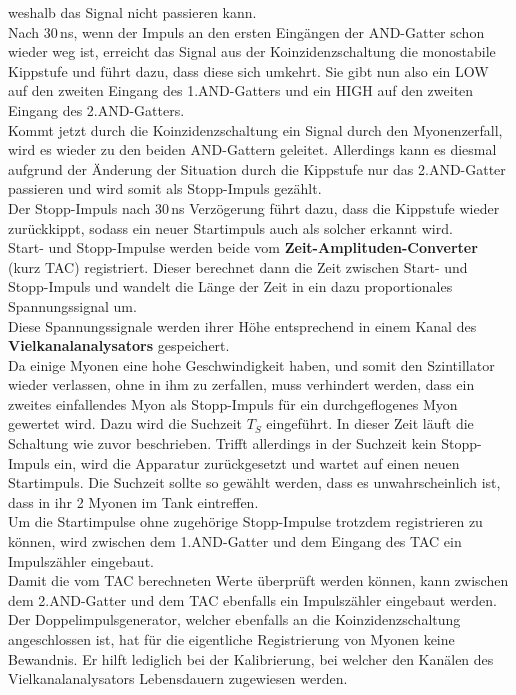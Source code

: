     weshalb das Signal nicht passieren kann.\\
    Nach 30\,ns, wenn der Impuls an den ersten Eingängen der AND-Gatter
    schon wieder weg ist, erreicht das Signal aus der Koinzidenzschaltung
    die monostabile Kippstufe und führt dazu, dass diese sich umkehrt.
    Sie gibt nun also ein LOW auf den zweiten Eingang des 1.AND-Gatters und ein
    HIGH auf den zweiten Eingang des 2.AND-Gatters. \\
    Kommt jetzt durch die Koinzidenzschaltung ein Signal durch den Myonenzerfall,
    wird es wieder zu den beiden AND-Gattern geleitet. Allerdings kann es
    diesmal aufgrund der Änderung der Situation durch die Kippstufe
    nur das 2.AND-Gatter passieren und wird somit als Stopp-Impuls gezählt.\\
    Der Stopp-Impuls nach 30\,ns Verzögerung führt dazu, dass
    die Kippstufe wieder zurückkippt, sodass ein neuer Startimpuls auch
    als solcher erkannt wird.\\
    Start- und Stopp-Impulse werden beide vom \textbf{Zeit-Amplituden-Converter}
    (kurz TAC) registriert. Dieser berechnet dann die Zeit zwischen Start-
    und Stopp-Impuls und wandelt die Länge der Zeit in ein dazu proportionales
    Spannungssignal um. \\
    Diese Spannungssignale werden ihrer Höhe entsprechend in einem Kanal
    des \textbf{Vielkanalanalysators} gespeichert.\\
    Da einige Myonen eine hohe Geschwindigkeit haben, und somit den
    Szintillator wieder verlassen, ohne in ihm zu zerfallen, muss verhindert
    werden, dass ein zweites einfallendes Myon als Stopp-Impuls für
    ein durchgeflogenes Myon gewertet wird. Dazu wird die Suchzeit $T_S$
    eingeführt. In dieser Zeit läuft die Schaltung wie zuvor beschrieben. Trifft
    allerdings in der Suchzeit kein Stopp-Impuls ein, wird die Apparatur
    zurückgesetzt und wartet auf einen neuen Startimpuls.
    Die Suchzeit sollte so gewählt werden, dass es unwahrscheinlich ist,
    dass in ihr 2 Myonen im Tank eintreffen.\\
    Um die Startimpulse ohne zugehörige Stopp-Impulse trotzdem registrieren zu
    können, wird zwischen dem 1.AND-Gatter und dem Eingang des
    TAC ein Impulszähler eingebaut.\\
    Damit die vom TAC berechneten Werte überprüft werden können,
    kann zwischen dem 2.AND-Gatter und dem TAC ebenfalls ein Impulszähler
    eingebaut werden.\\
    Der Doppelimpulsgenerator, welcher ebenfalls an die Koinzidenzschaltung
    angeschlossen ist, hat für die eigentliche Registrierung von Myonen
    keine Bewandnis. Er hilft lediglich bei der Kalibrierung, bei welcher
    den Kanälen des Vielkanalanalysators Lebensdauern zugewiesen werden.

